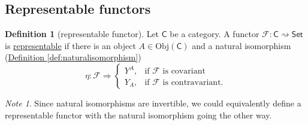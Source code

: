 \documentclass[a4paper]{report}
\newcommand{\defn}[1]{\ul{#1}}
\newcommand{\Obj}{\mathrm{Obj}}
\theoremstyle{definition}
\newtheorem{definition}{Definition}[section]
\theoremstyle{plain}
\theoremstyle{remark}
\newtheorem{note}{Note}[section]
\begin{document}
\subsection{Representable functors}
\begin{definition}[representable functor]
  \label{def:representablefunctor}
  Let $\mathsf{C}$ be a category. A functor $\mathcal{F}\colon \mathsf{C} \rightsquigarrow \mathsf{Set}$ is \defn{representable} if there is an object $A \in \Obj(\mathsf{C})$ and a natural isomorphism (\hyperref[def:naturalisomorphism]{Definition \ref*{def:naturalisomorphism}})
  \begin{equation*}
    \eta\colon \mathcal{F} \Rightarrow 
    \begin{cases}
      Y^{A}, & \text{if $\mathcal{F}$ is covariant} \\
      Y_{A}, & \text{if $\mathcal{F}$ is contravariant.}
    \end{cases}
  \end{equation*}
\end{definition}

\begin{note}
  Since natural isomorphisms are invertible, we could equivalently define a representable functor with the natural isomorphism going the other way.
\end{note}
\end{document}
